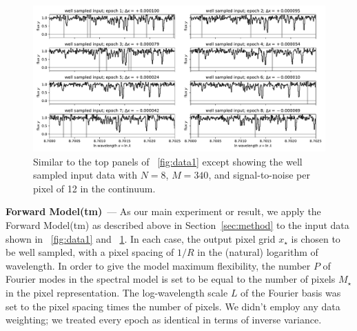 \documentclass[modern]{aastex631}
\renewcommand{\paragraph}[1]{\medskip\par\noindent\textbf{#1}~---}
\newlength{\figurewidth}
\newcommand{\sectionname}{Section}
\begin{document}
\begin{figure}[t!]
    \begin{mdframed}\begin{center}
    \includegraphics[width=1.3\figurewidth]{notebooks/data2.pdf}
    \end{center}
    \caption{Similar to the top panels of \figurename~\ref{fig:data1} except showing the well sampled input data with $N=8$, $M=340$, and signal-to-noise per pixel of 12 in the continuum.\label{fig:data2}}
    \end{mdframed}
\end{figure}

\paragraph{Forward Model(tm)}
As our main experiment or result, we apply the Forward Model(tm) as described above in \sectionname~\ref{sec:method} to the input data shown in \figurename~\ref{fig:data1} and \figurename~\ref{fig:data2}.
In each case, the output pixel grid $x_\star$ is chosen to be well sampled, with a pixel spacing of $1/R$ in the (natural) logarithm of wavelength.
In order to give the model maximum flexibility, the number $P$ of Fourier modes in the spectral model is set to be equal to the number of pixels $M_\star$ in the pixel representation.
The log-wavelength scale $L$ of the Fourier basis was set to the pixel spacing times the number of pixels.
We didn't employ any data weighting; we treated every epoch as identical in terms of inverse variance.
\end{document}
